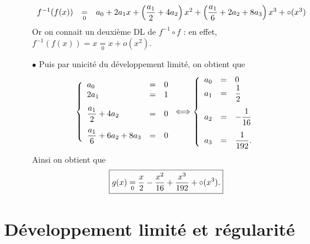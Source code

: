 \documentclass[a4paper, 11pt,reqno]{article}
\begin{document}
\begin{correction}
\begin{enumerate}
\begin{itemize}
$$\begin{array}{lll}
					            f^{-1}(f(x)) & \underset{0}{=} & a_0+2a_1x +\left( \displaystyle\frac{a_1}{2}+4a_2   \right)x^2+\left( \displaystyle\frac{a_1}{6}+2a_2+8a_3   \right)x^3   +\circ(x^3)
				            \end{array}$$
			            Or on connait un deuxi\`eme DL de $f^{-1}\circ f$ : en effet, $f^{-1}(f(x)) =x \underset{0}{=} x + o(x^2)$.
			      \item[$\bullet$] Puis par unicit\'e du d\'eveloppement limit\'e, on obtient que
			            $$\left\lbrace
				            \begin{array}{lll}
					            a_0                         & = & 0      \\
					            2a_1                        & = & 1\vsec \\
					            \ddp\frac{a_1}{2}+4a_2      & = & 0\vsec \\
					            \ddp\frac{a_1}{6}+6a_2+8a_3 & = & 0
				            \end{array}
				            \right.
				            \Longleftrightarrow
				            \left\lbrace
				            \begin{array}{lll}
					            a_0 & = & 0                      \\
					            a_1 & = & \ddp\demi\vsec         \\
					            a_2 & = & -\ddp\frac{1}{16}\vsec \\
					            a_3 & = & \ddp\frac{1}{192}.
				            \end{array}
				            \right.
			            $$
			            Ainsi on obtient que
			            $$\fbox{$ g(x)\underset{0}{=} \displaystyle\frac{x}{2}-\displaystyle\frac{x^2}{16}+\displaystyle\frac{x^3}{192}+\circ(x^3).  $}$$
		      \end{itemize}
	\end{enumerate}
\end{correction}

\vspace{0.5cm}

\noindent\section{\large{D\'eveloppement limit\'e et r\'egularit\'e}}
\end{document}
